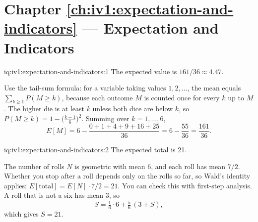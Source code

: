 \section*{Chapter \ref{ch:iv1:expectation-and-indicators} --- Expectation and Indicators}

\enlargethispage{-4\baselineskip}%
\begin{solution}{iq:iv1:expectation-and-indicators:1}
The expected value is $161/36 \approx 4.47$.

Use the tail-sum formula: for a variable taking values $1, 2, \dots$, the mean equals
$\sum_{k \ge 1} P(M \ge k)$, because each outcome $M$ is counted once for every $k$ up to $M$. The higher die is at
least $k$ unless both dice are below $k$, so $P(M \ge k) = 1 - \bigl(\tfrac{k-1}{6}\bigr)^2$. Summing over
$k = 1, \dots, 6$,
\[
E[M] = 6 - \frac{0 + 1 + 4 + 9 + 16 + 25}{36} = 6 - \frac{55}{36} = \frac{161}{36}.
\]
\end{solution}

\begin{solution}{iq:iv1:expectation-and-indicators:2}
The expected total is 21.

The number of rolls $N$ is geometric with mean 6, and each roll has mean $7/2$. Whether you stop after a roll
depends only on the rolls so far, so Wald's identity applies: $E[\text{total}] = E[N] \cdot
7/2 = 21$. You can check this with first-step analysis. A roll that is not a six has mean 3, so
\[
S = \tfrac16 \cdot 6 + \tfrac56 \,(3 + S),
\]
which gives $S = 21$.

\end{solution}

